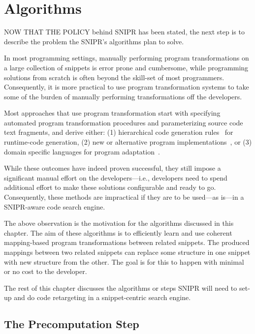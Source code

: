 \chapter{Algorithms}{}
\label{chap:algorithms}

\lettrine[lraise=0.1, nindent=0em, slope=-.5em]{N}{OW THAT THE POLICY} behind \uppercase{SNIPR} has been stated, the next step is to describe the problem the SNIPR's algorithms plan to solve.

In most programming settings, manually performing program transformations on a large collection of snippets is error prone and cumbersome, while programming solutions from scratch is often beyond the skill-set of most programmers. Consequently, it is more practical to use program transformation systems to take some of the burden of manually performing transformations off the developers.

Most approaches that use program transformation start with specifying automated program transformation procedures and parameterizing source code text fragments, and derive either: (1) hierarchical code generation rules~\cite{Nita:2010en} for runtime-code generation, (2) new or alternative program implementations~\cite{Wightman:2012gc}, or (3) domain specific languages for program adaptation~\cite{Visser:2001tc}.

While these outcomes have indeed proven successful, they still impose a significant manual effort on the developers---i.e., developers need to spend additional effort to make these solutions configurable and ready to go. Consequently, these methods are impractical if they are to be used---as is---in a \uppercase{SNIPR}-aware code search engine. 

The above observation is the motivation for the algorithms discussed in this chapter. The aim of these algorithms is to efficiently learn and use coherent mapping-based program transformations between related snippets. The produced mappings between two related snippets can replace some structure in one snippet with new structure from the other. The goal is for this to happen with minimal or no cost to the developer. 

The rest of this chapter discusses the algorithms or steps \uppercase{SnipR} will need to set-up and do code retargeting in a snippet-centric search engine.

\section{The Precomputation Step}
\label{sec:precomputation}

